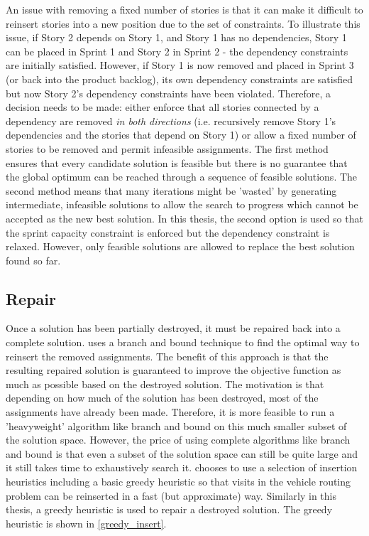 An issue with removing a fixed number of stories is that it can make it difficult to reinsert stories into a new position due to the set of constraints. To illustrate this issue, if Story 2 depends on Story 1, and Story 1 has no dependencies, Story 1 can be placed in Sprint 1 and Story 2 in Sprint 2 - the dependency constraints are initially satisfied. However, if Story 1 is now removed and placed in Sprint 3 (or back into the product backlog), its own dependency constraints are satisfied but now Story 2's dependency constraints have been violated. Therefore, a decision needs to be made: either enforce that all stories connected by a dependency are removed \emph{in both directions} (i.e. recursively remove Story 1's dependencies and the stories that depend on Story 1) or allow a fixed number of stories to be removed and permit infeasible assignments. The first method ensures that every candidate solution is feasible but there is no guarantee that the global optimum can be reached through a sequence of feasible solutions. The second method means that many iterations might be 'wasted' by generating intermediate, infeasible solutions to allow the search to progress which cannot be accepted as the new best solution. In this thesis, the second option is used so that the sprint capacity constraint is enforced but the dependency constraint is relaxed. However, only feasible solutions are allowed to replace the best solution found so far.

\subsection{Repair} \label{repair}

Once a solution has been partially destroyed, it must be repaired back into a complete solution. \citet{shaw1998using} uses a branch and bound technique to find the optimal way to reinsert the removed assignments. The benefit of this approach is that the resulting repaired solution is guaranteed to improve the objective function as much as possible based on the destroyed solution. The motivation is that depending on how much of the solution has been destroyed, most of the assignments have already been made. Therefore, it is more feasible to run a 'heavyweight' algorithm like branch and bound on this much smaller subset of the solution space. However, the price of using complete algorithms like branch and bound is that even a subset of the solution space can still be quite large and it still takes time to exhaustively search it. \citet{ropke2006adaptive} chooses to use a selection of insertion heuristics including a basic greedy heuristic so that visits in the vehicle routing problem can be reinserted in a fast (but approximate) way. Similarly in this thesis, a greedy heuristic is used to repair a destroyed solution. The greedy heuristic is shown in \cref{greedy_insert}.

